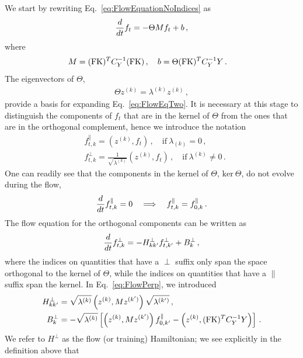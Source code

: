 \documentclass[11pt]{article}
\begin{document}
We start by rewriting Eq.~\eqref{eq:FlowEquationNoIndices} as
\begin{align}
    \label{eq:FlowEqTwo}
    \frac{d}{dt} f_t = -\Theta M f_t + b\, ,
\end{align}
where 
\begin{align}
    M &= (\mathrm{FK})^T C_Y^{-1} (\mathrm{FK})\, , \quad b = \Theta (\mathrm{FK})^T C_Y^{-1} Y\, .
\end{align}
The eigenvectors of $\Theta$, 
\begin{align}
    \label{eq:ThetaEigensystem}
    \Theta z^{(k)} = \lambda^{(k)} z^{(k)}\, ,
\end{align}
provide a basis for expanding Eq.~\eqref{eq:FlowEqTwo}. It is necessary at this stage to distinguish
the components of $f_t$ that are in the kernel of $\Theta$ from the ones that are in the orthogonal 
complement, hence we introduce the notation
\begin{align}
    &f^\parallel_{t,k} = \left(z^{(k)}, f_t\right)\, , \quad \text{if}\ \lambda_{(k)} = 0\, , \\
    &f^\perp_{t,k} = \frac{1}{\sqrt{\lambda^{(k)}}} \left(z^{(k)}, f_t\right)\, , \quad 
        \text{if}\ \lambda^{(k)} \neq 0\, .
\end{align}
One can readily see that the components in the kernel of $\Theta$, $\text{ker}\ \Theta$, 
do not evolve during the flow, 
\begin{align}
    \label{eq:FlowParallel}
    \frac{d}{dt} f^\parallel_{t,k} = 0 
        \quad \Longrightarrow \quad f^\parallel_{t,k} = f^\parallel_{0,k}\, .
\end{align}
The flow equation for the orthogonal components can be written as
\begin{align}
    \label{eq:FlowPerp}
    \frac{d}{dt} f^\perp_{t,k} = - H^\perp_{kk'} f^\perp_{t,k'} 
        + B^\perp_{k}\, ,    
\end{align}
where the indices on quantities that have a $\perp$ suffix only span the space orthogonal to the kernel 
of $\Theta$, while the indices on quantities that have a $\parallel$ suffix span the kernel. 
In Eq.~\eqref{eq:FlowPerp}, we introduced
\begin{align}
    H^\perp_{kk'} &= \sqrt{\lambda^{(k)}} \left(z^{(k)}, M z^{(k')}\right) \sqrt{\lambda^{(k')}}\, ,\\
    B^\perp_k &= -\sqrt{\lambda^{(k)}} \left[\left(z^{(k)}, M z^{(k')}\right) f^\parallel_{0,k'} 
        - \left(z^{(k)}, (\mathrm{FK})^T C_Y^{-1} Y\right)\right]\, .
\end{align}
We refer to $H^\perp$ as the flow (or training) Hamiltonian; we see explicitly in the definition above that 
\end{document}
